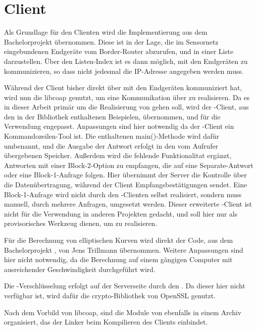\section{Client}
\label{sec:client}

Als Grundlage für den Clienten wird die Implementierung aus dem Bachelorprojekt  übernommen. Diese ist in der Lage, die im Sensornetz eingebundenen
Endgeräte vom Border-Router abzurufen, und in einer Liste darzustellen. Über den Listen-Index ist es dann möglich, mit den Endgeräten zu kommunizieren,
so dass nicht jedesmal die IP-Adresse angegeben werden muss.

Während der Client bisher direkt über  mit den Endgeräten kommuniziert hat, wird nun die libcoap \cite{libcoap} genutzt, um eine Kommunikation
über  zu realisieren. Da es in dieser Arbeit primär um die Realisierung von  gehen soll, wird der -Client, aus den in der
Bibliothek enthaltenen Beispielen, übernommen, und für die Verwendung engepasst. Anpassungen sind hier notwendig da der -Client ein
Kommandozeilen-Tool ist. Die enthaltenen main()-Methode wird dafür umbenannt, und die Ausgabe der Antwort erfolgt in den vom Aufrufer übergebenen Speicher.
Außerdem wird die fehlende Funktionalitat ergänzt, Antworten mit einer Block-2-Option zu empfangen, die auf eine Separate-Antwort oder eine Block-1-Anfrage
folgen. Hier übernimmt der Server die Kontrolle über die Datenübertragung, während der Client Empfangsbestätigungen sendet. Eine Block-1-Anfrage wird
nicht durch den -Clienten selbst realisiert, sondern muss manuell, durch mehrere Anfragen, umgesetzt werden. Dieser erweiterte -Client
ist nicht für die Verwendung in anderen Projekten gedacht, und soll hier nur als provisorisches Werkzeug dienen, um  zu realisieren.

Für die Berechnung von elliptischen Kurven wird direkt der Code, aus dem Bachelorprojekt , von Jens Trillmann übernommen. Weitere Anpassungen
sind hier nicht notwendig, da die Berechnung auf einem gängigen Computer mit ausreichender Geschwindigkeit durchgeführt wird.

Die -Verschlüsselung erfolgt auf der Serverseite durch den . Da dieser hier nicht verfügbar ist, wird dafür die
crypto-Bibliothek von OpenSSL \cite{openssl} genutzt. 

Nach dem Vorbild von libcoap, sind die Module von  ebenfalls in einem Archiv organisiert, das der Linker beim Kompilieren des Clients einbindet.

